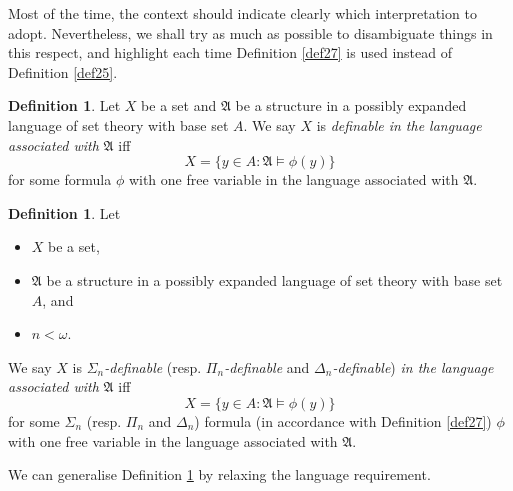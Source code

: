 \documentclass[12pt, twoside]{memoir}
\numberwithin{equation}{section}
\theoremstyle{definition}
\newtheorem{defi}[thm]{Definition}
\theoremstyle{remark}
\theoremstyle{definition}
\theoremstyle{definition}
\theoremstyle{definition}
\theoremstyle{remark}
\begin{document}
Most of the time, the context should indicate clearly which interpretation to adopt. Nevertheless, we shall try as much as possible to disambiguate things in this respect, and highlight each time Definition \ref{def27} is used instead of Definition \ref{def25}.

\begin{defi}
Let $X$ be a set and $\mathfrak{A}$ be a structure in a possibly expanded language of set theory with base set $A$. We say $X$ is \emph{definable in the language associated with} $\mathfrak{A}$ iff $$X = \{y \in A : \mathfrak{A} \models \phi(y)\}$$ for some formula $\phi$ with one free variable in the language associated with $\mathfrak{A}$.
\end{defi}

\begin{defi}\label{def29}
Let 
\begin{itemize}
    \item $X$ be a set,
    \item $\mathfrak{A}$ be a structure in a possibly expanded language of set theory with base set $A$, and
    \item $n < \omega$. 
\end{itemize} 
We say $X$ is $\Sigma_n$\emph{-definable} (resp. $\Pi_n$\emph{-definable} and $\Delta_n$\emph{-definable}) \emph{in the language associated with} $\mathfrak{A}$ iff $$X = \{y \in A : \mathfrak{A} \models \phi(y)\}$$ for some $\Sigma_n$ (resp. $\Pi_n$ and $\Delta_n$) formula (in accordance with Definition \ref{def27}) $\phi$ with one free variable in the language associated with $\mathfrak{A}$.
\end{defi}

We can generalise Definition \ref{def29} by relaxing the language requirement.
\end{document}
